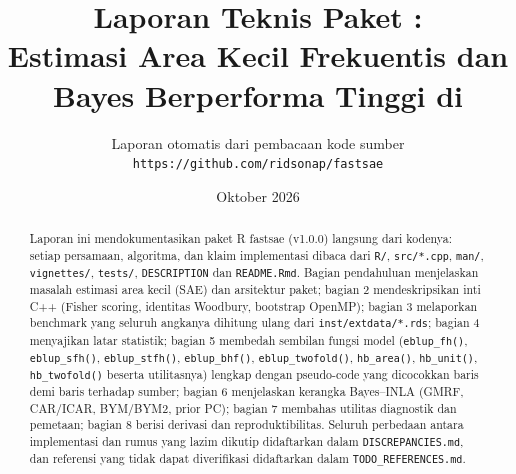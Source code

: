 \documentclass[11pt,a4paper]{article}
\title{\bfseries Laporan Teknis Paket \pkg{fastsae}:\\[4pt]
  \large Estimasi Area Kecil Frekuentis dan Bayes Berperforma Tinggi di \pkg{R}}
\author{Laporan otomatis dari pembacaan kode sumber \pkg{fastsae}\\
  \texttt{https://github.com/ridsonap/fastsae}}
\date{Oktober 2026}
\newcommand{\code}[1]{\texttt{#1}}
\newcommand{\pkg}[1]{\textsf{#1}}
\newcommand{\fct}[1]{\code{#1()}}
\begin{document}
\maketitle

\begin{abstract}
\noindent Laporan ini mendokumentasikan paket R \pkg{fastsae} (v1.0.0) langsung dari
kodenya: setiap persamaan, algoritma, dan klaim implementasi dibaca dari
\code{R/}, \code{src/*.cpp}, \code{man/}, \code{vignettes/}, \code{tests/},
\code{DESCRIPTION} dan \code{README.Rmd}. Bagian pendahuluan menjelaskan masalah
estimasi area kecil (SAE) dan arsitektur paket; bagian 2 mendeskripsikan inti
C++ (Fisher scoring, identitas Woodbury, bootstrap OpenMP); bagian 3 melaporkan
benchmark yang seluruh angkanya dihitung ulang dari \code{inst/extdata/*.rds};
bagian 4 menyajikan latar statistik; bagian 5 membedah sembilan fungsi model
(\fct{eblup\_fh}, \fct{eblup\_sfh}, \fct{eblup\_stfh}, \fct{eblup\_bhf},
\fct{eblup\_twofold}, \fct{hb\_area}, \fct{hb\_unit}, \fct{hb\_twofold} beserta
utilitasnya) lengkap dengan pseudo-code yang dicocokkan baris demi baris
terhadap sumber; bagian 6 menjelaskan kerangka Bayes--INLA (GMRF, CAR/ICAR,
BYM/BYM2, prior PC); bagian 7 membahas utilitas diagnostik dan pemetaan; bagian
8 berisi derivasi dan reproduktibilitas. Seluruh perbedaan antara implementasi
dan rumus yang lazim dikutip didaftarkan dalam \code{DISCREPANCIES.md}, dan
referensi yang tidak dapat diverifikasi didaftarkan dalam
\code{TODO\_REFERENCES.md}.
\end{abstract}

\tableofcontents
{\sloppy
\listoffigures
\listoftables}
\newpage


















\end{document}
